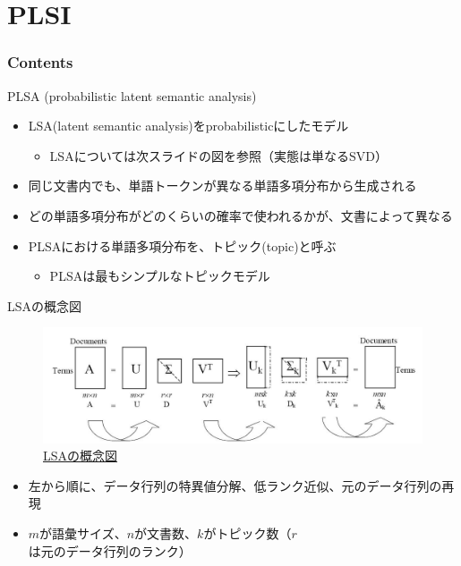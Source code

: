 \documentclass[aspectratio=169,unicode,dvipdfmx,14pt]{beamer}
\begin{document}
\section{PLSI}

\begin{frame}\frametitle{Contents}
\Large \tableofcontents[currentsection]
\end{frame}

\begin{frame}{PLSA (probabilistic latent semantic analysis)}
\begin{itemize}
\item LSA(latent semantic analysis)をprobabilisticにしたモデル
\begin{itemize}
\item LSAについては次スライドの図を参照（実態は単なるSVD）
\end{itemize}
\item 同じ文書内でも、単語トークンが異なる単語多項分布から生成される
\item どの単語多項分布がどのくらいの確率で使われるかが、文書によって異なる
\item PLSAにおける単語多項分布を、トピック(topic)と呼ぶ
\begin{itemize}
\item PLSAは最もシンプルなトピックモデル
\end{itemize}
\end{itemize}
\end{frame}

\begin{frame}{LSAの概念図}
\FontMath
\vspace{-.2in}
\begin{figure}[htbp]
\begin{center}
\includegraphics[scale=0.47]{svd1.jpg}
\caption{\href{https://liqiangguo.wordpress.com/2011/06/09/latent-semantic-analysis/}{LSAの概念図}}
\label{fig:LSA}
\end{center}
\end{figure}
\begin{itemize}
\item 左から順に、データ行列の特異値分解、低ランク近似、元のデータ行列の再現
\item $m$が語彙サイズ、$n$が文書数、$k$がトピック数（$r$は元のデータ行列のランク）
\end{itemize}
\end{frame}
\end{document}
